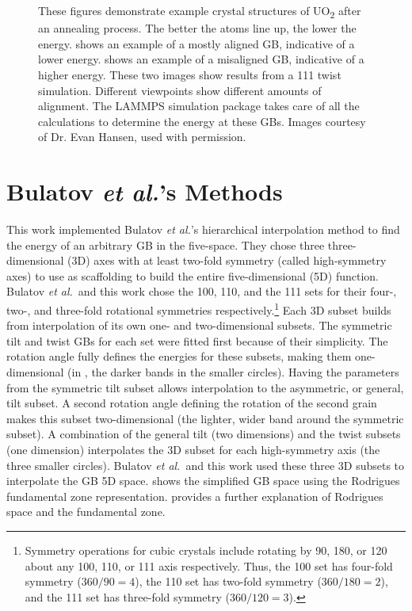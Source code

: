 \documentclass[12pt]{report}
\begin{document}
\begin{figure}[ht!]
 \caption[An example of crystal structure after annealing.]{\label{fig:lammps}These figures demonstrate example crystal structures of UO\textsubscript{2} after an annealing process.  The better the atoms line up, the lower the energy. \protect{} shows an example of a mostly aligned GB, indicative of a lower energy.  \protect{} shows an example of a misaligned GB, indicative of a higher energy.  These two images show results from a \textlangle{}111\textrangle{} twist simulation.  Different viewpoints show different amounts of alignment.  The LAMMPS simulation package takes care of all the calculations to determine the energy at these GBs. Images courtesy of Dr. Evan Hansen, used with permission.}
\end{figure}

\section{Bulatov \emph{et al.}'s Methods\label{methods:bulatov}}
This work implemented Bulatov \emph{et al.}'s hierarchical interpolation method to find the energy of an arbitrary GB in the five-space.\cite{bulatov2014}  They chose three three-dimensional (3D) axes with at least two-fold symmetry (called high-symmetry axes) to use as scaffolding to build the entire five-dimensional (5D) function.  Bulatov \emph{et al.}\ and this work chose the \textlangle{}100\textrangle{}, \textlangle{}110\textrangle{}, and the \textlangle{}111\textrangle{} sets for their four-, two-, and three-fold rotational symmetries respectively.\footnote{Symmetry operations for cubic crystals include rotating by 90\textdegree{}, 180\textdegree{}, or 120\textdegree{} about any \textlangle{}100\textrangle{}, \textlangle{}110\textrangle{}, or \textlangle{}111\textrangle{} axis respectively.\cite{stokes2007}  Thus, the \textlangle{}100\textrangle{} set has four-fold symmetry (360\textdegree{}$/90$\textdegree{}$=4$), the \textlangle{}110\textrangle{} set has two-fold symmetry (360\textdegree{}$/180$\textdegree{}$=2$), and the \textlangle{}111\textrangle{} set has three-fold symmetry (360\textdegree{}$/120$\textdegree{}$=3$).}  Each 3D subset builds from interpolation of its own one- and two-dimensional subsets.  The symmetric tilt and twist GBs for each set were fitted first because of their simplicity.  The rotation angle fully defines the energies for these subsets, making them one-dimensional (in , the darker bands in the smaller circles).  Having the parameters from the symmetric tilt subset allows interpolation to the asymmetric, or general, tilt subset.  A second rotation angle defining the rotation of the second grain makes this subset two-dimensional (the lighter, wider band around the symmetric subset).  A combination of the general tilt (two dimensions) and the twist subsets (one dimension) interpolates the 3D subset for each high-symmetry axis (the three smaller circles).  Bulatov \emph{et al.}\ and this work used these three 3D subsets to interpolate the GB 5D space.  shows the simplified GB space using the Rodrigues fundamental zone representation.  provides a further explanation of Rodrigues space and the fundamental zone.
\end{document}

